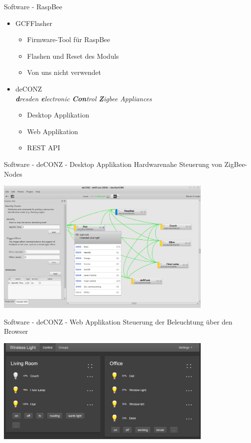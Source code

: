 \begin{frame}{Software - RaspBee}
  \Large
  \begin{itemize}
    \item GCFFlasher
    \begin{itemize}
      \Large
      \item Firmware-Tool für RaspBee
      \item Flashen und Reset des Moduls
      \item Von uns nicht verwendet
      \newline
    \end{itemize}
	\item deCONZ\\
      \normalsize{\textit{\textbf dresden \textbf electronic \textbf{Con}trol
        \textbf Zigbee Appliances}}
    \begin{itemize}
      \Large
      \item Desktop Applikation
      \item Web Applikation
      \item REST API
    \end{itemize}
  \end{itemize}
\end{frame}

\begin{frame}{Software - deCONZ - Desktop Applikation}
  \Large
  Hardwarenahe Steuerung von ZigBee-Nodes
  \begin{center}
    \includegraphics[width=0.8\textwidth]{images/deconz_app}
  \end{center}
\end{frame}

\begin{frame}{Software - deCONZ - Web Applikation}
  \Large
  Steuerung der Beleuchtung über den Browser
  \begin{center}
    \includegraphics[width=0.8\textwidth]{images/deconz_web}
  \end{center}
\end{frame}

